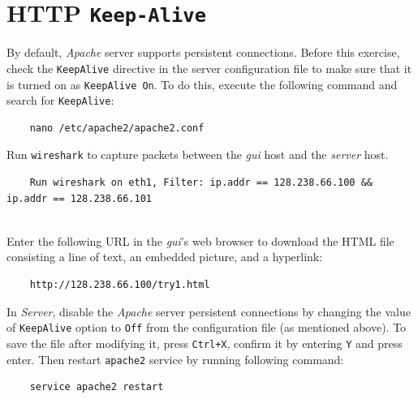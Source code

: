 \documentclass{UTNetLab}
\begin{document}
    
\section{HTTP \texttt{Keep-Alive}}
    By default, \textit{Apache} server supports persistent connections. Before this exercise, check the \texttt{KeepAlive} directive in the server configuration file to make sure that it is turned on as \lstinline[language={HTTP}]{KeepAlive On}. To do this, execute the following command and search for \lstinline{KeepAlive}:
	
    \begin{lstlisting}
    nano /etc/apache2/apache2.conf
    \end{lstlisting}

    Run \lstinline{wireshark} to capture packets between the \textit{gui} host and the \textit{server} host.
    
    \begin{lstlisting}
    Run wireshark on eth1, Filter: ip.addr == 128.238.66.100 && ip.addr == 128.238.66.101
       
    \end{lstlisting}


    Enter the following URL in the \textit{gui}'s web browser to download the HTML file consisting a line of text, an embedded picture, and a hyperlink:
    
	\begin{lstlisting}
	http://128.238.66.100/try1.html
	\end{lstlisting}
	
    In \textit{Server}, disable the \textit{Apache} server persistent connections by changing the value of \texttt{KeepAlive} option to \lstinline{Off} from the configuration file (as mentioned above). To save the file after modifying it, press \lstinline{Ctrl+X}, confirm it by entering \lstinline{Y} and press enter. Then restart \lstinline{apache2} service by running following command:
    
    \begin{lstlisting}
    service apache2 restart
    \end{lstlisting}
    
\end{document}
